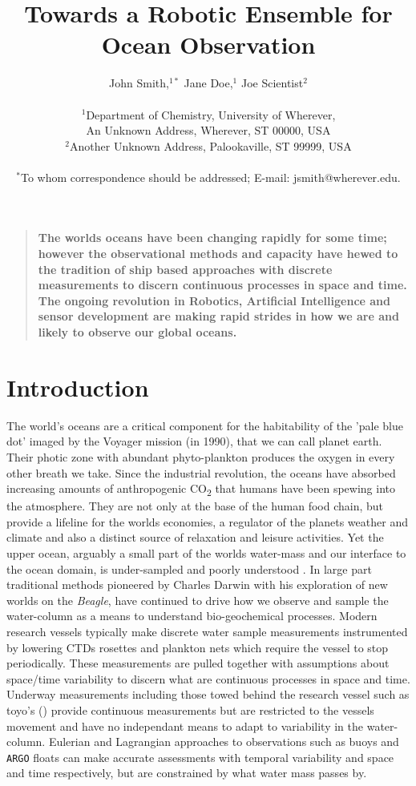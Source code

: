 \documentclass[12pt]{article}
\title{Towards a Robotic Ensemble for Ocean Observation}
\author
{John Smith,$^{1\ast}$ Jane Doe,$^{1}$ Joe Scientist$^{2}$\\
\\
\normalsize{$^{1}$Department of Chemistry, University of Wherever,}\\
\normalsize{An Unknown Address, Wherever, ST 00000, USA}\\
\normalsize{$^{2}$Another Unknown Address, Palookaville, ST 99999, USA}\\
\\
\normalsize{$^\ast$To whom correspondence should be addressed; E-mail:  jsmith@wherever.edu.}
}
\date{}
\newenvironment{sciabstract}{%
\begin{quote} \bf}
{\end{quote}}
\begin{document}
\baselineskip24pt


\maketitle 


\begin{sciabstract}
  The worlds oceans have been changing rapidly for some time; however
  the observational methods and capacity have hewed to the tradition
  of ship based approaches with discrete measurements to discern
  continuous processes in space and time.  The ongoing revolution in
  Robotics, Artificial Intelligence and sensor development are making
  rapid strides in how we are and likely to observe our global
  oceans. 
\end{sciabstract}



\section{Introduction}

The world's oceans are a critical component for the habitability of
the 'pale blue dot' imaged by the Voyager mission (in 1990), that we
can call planet earth. Their photic zone with abundant phyto-plankton
produces the oxygen in every other breath we take. Since the
industrial revolution, the oceans have absorbed increasing amounts of
anthropogenic CO\textsubscript{2} that humans have been spewing into
the atmosphere. They are not only at the base of the human food chain,
but provide a lifeline for the worlds economies, a regulator of the
planets weather and climate and also a distinct source of relaxation
and leisure activities. Yet the upper ocean, arguably a small part of
the worlds water-mass and our interface to the ocean domain, is
under-sampled and poorly understood \cite{munk2002}. In large part
traditional methods pioneered by Charles Darwin with his exploration
of new worlds on the \emph{Beagle}, have continued to drive how we
observe and sample the water-column as a means to understand
bio-geochemical processes. Modern research vessels typically make
discrete water sample measurements instrumented by lowering CTDs
rosettes and plankton nets which require the vessel to stop
periodically. These measurements are pulled together with assumptions
about space/time variability to discern what are continuous processes
in space and time. Underway measurements including those towed behind
the research vessel such as toyo's () provide continuous
measurements but are restricted to the vessels movement and have no
independant means to adapt to variability in the
water-column. Eulerian and Lagrangian approaches to observations such
as buoys and \texttt{ARGO} floats \cite{roemmich09} can make accurate
assessments with temporal variability and space and time respectively,
but are constrained by what water mass passes by.
\end{document}
